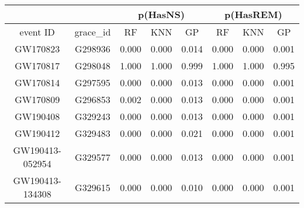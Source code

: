 \begin{table}[]
\begin{tabular}{c|c|ccr|ccr}
\hline
\multicolumn{1}{c|}{}         & \multicolumn{1}{l|}{} & \multicolumn{3}{c|}{p(HasNS)}                                                & \multicolumn{3}{c}{p(HasREM)}                                                \\ \hline
\multicolumn{1}{c|}{event ID} & grace\_id             & \multicolumn{1}{c}{RF} & \multicolumn{1}{c}{KNN} & \multicolumn{1}{c|}{GP} & \multicolumn{1}{c}{RF} & \multicolumn{1}{c}{KNN} & \multicolumn{1}{c|}{GP} \\ \hline
GW170823                      & G298936               & 0.000                   & 0.000                    & 0.014                   & 0.000                   & 0.000                    & 0.001                   \\
GW170817                      & G298048               & 1.000                   & 1.000                    & 0.999                   & 1.000                   & 1.000                    & 0.995                   \\
GW170814                      & G297595               & 0.000                   & 0.000                    & 0.013                   & 0.000                   & 0.000                    & 0.001                   \\
GW170809                      & G296853               & 0.002                   & 0.000                    & 0.013                   & 0.000                   & 0.000                    & 0.001                   \\
GW190408                      & G329243               & 0.000                   & 0.000                    & 0.013                   & 0.000                   & 0.000                    & 0.001                   \\
GW190412                      & G329483               & 0.000                   & 0.000                    & 0.021                   & 0.000                   & 0.000                    & 0.001                   \\
GW190413-052954               & G329577               & 0.000                   & 0.000                    & 0.013                   & 0.000                   & 0.000                    & 0.001                   \\
GW190413-134308               & G329615               & 0.000                   & 0.000                    & 0.010                   & 0.000                   & 0.000                    & 0.001                   \\

\end{tabular}
\end{table}
